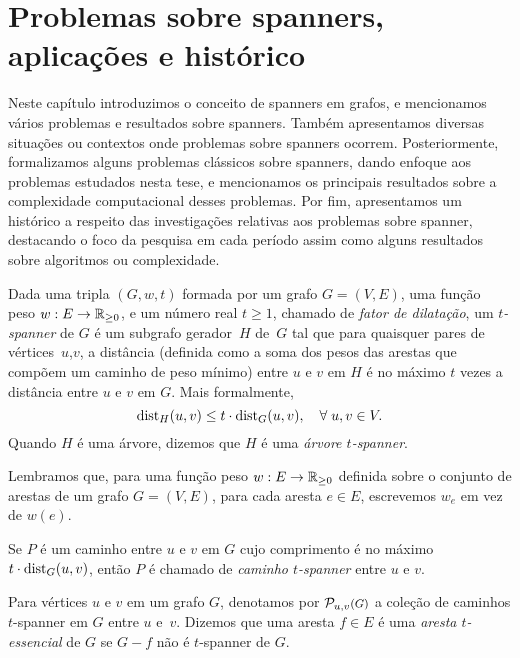 \chapter{Problemas sobre spanners, aplicações e histórico}
\label{cap:conceitos_historico-v2}
Neste capítulo introduzimos o conceito de spanners em grafos, e mencionamos vários problemas e resultados sobre spanners. Também apresentamos diversas situações ou contextos onde problemas sobre spanners ocorrem.  Posteriormente, formalizamos alguns problemas clássicos sobre spanners, dando enfoque aos problemas estudados nesta tese, e mencionamos os principais resultados sobre a  complexidade computacional desses problemas. Por fim, apresentamos um histórico a respeito das investigações relativas aos problemas sobre spanner, destacando o foco da pesquisa em cada período assim como alguns resultados sobre algoritmos ou complexidade.



Dada uma tripla $(G,w,t)$ formada por um grafo $G=(V,E)$, uma função peso \mbox{$w: E \to \mathbb{R}_{\ge 0}$}, e um número real $t \ge 1$, chamado de \emph{fator de dilatação}, um \emph{$t$-spanner} de $G$ é um subgrafo gerador~$H$ de~$G$ tal que
para quaisquer pares de vértices~$u$,$v$, a distância (definida
como a soma dos pesos das arestas que compõem um caminho de peso mínimo)
entre $u$ e $v$ em $H$ é no máximo $t$ vezes a distância entre $u$ e $v$ em $G$.  Mais formalmente,
\begin{equation}
{\mathrm{dist}}_{H}(u,v) \le t \cdot {\mathrm{dist}}_{G}(u,v), \quad \forall\;u,v \in V. 
\label{eq:def_spanner}
\end{equation}
Quando $H$ é uma árvore, dizemos que $H$ é uma \emph{árvore $t$-spanner}.

Lembramos que, para uma função peso
  \mbox{$w: E \to \mathbb{R}_{\ge 0}$} definida sobre o conjunto de arestas de um grafo
  $G=(V,E)$, para cada aresta $e \in E$, escrevemos $w_e$ em vez de $w(e)$.

Se $P$ é um caminho entre $u$ e $v$ em $G$ cujo comprimento 
é no máximo $t \cdot {\mathrm{dist}}_{G}(u,v)$,  então $P$ é chamado de
\emph{caminho $t$-spanner} entre $u$ e $v$. 

Para vértices $u$ e $v$ em um grafo $G$, denotamos por $\PathuvG$ a coleção de caminhos $t$-spanner em $G$ entre $u$ e~$v$.  Dizemos que uma aresta $f \in E$ é uma \emph{aresta $t$-essencial}
de $G$ se $G-f$ não é $t$-spanner de $G$. 

